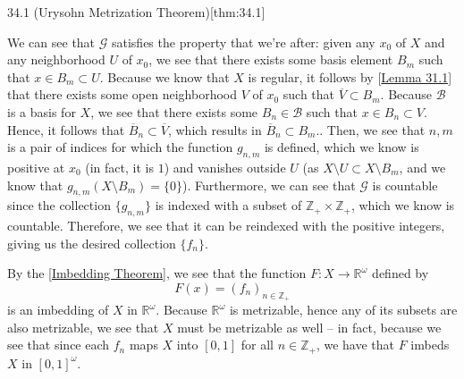 \begin{thmBox}{34.1 (Urysohn Metrization Theorem)}[thm:34.1]
\begin{proofBox}
        \baseSkip

        We can see that \( \mathcal{G} \) satisfies the property that we're after:
        given any \( x_{ 0 } \) of \( X \) and any neighborhood \( U \) of 
        \( x_{ 0 } \), we see that there exists some basis element \( B_{ m } \)
        such that \( x \in B_{ m } \subset U \).
        Because we know that \( X \) is regular, it follows by 
        [\hyperlink{lem:31.1}{Lemma 31.1}] that there exists some open neighborhood 
        \( V \) of \( x_{ 0 } \) such that \( \overline{ V } \subset B_{ m } \).
        Because \( \mathcal{B} \) is a basis for \( X \), we see that there exists 
        some \( B_{ n } \in \mathcal{B} \) such that \( x \in B_{ n } \subset V \).
        Hence, it follows that \( \overline{ B }_{ n } \subset \overline{ V } \),
        which results in \( \overline{ B }_{ n } \subset B_{ m } \)..
        Then, we see that \( n, m \) is a pair of indices for which the function
        \( g_{ n, m } \) is defined, which we know is positive at \( x_{ 0 } \)
        (in fact, it is \( 1 \)) and vanishes outside \( U \) (as 
        \( X \setminus U \subset X \setminus B_{ m } \), and we know that 
        \( g_{ n, m } ( X \setminus B_{ m } ) = \{ 0 \} \)).
        Furthermore, we can see that \( \mathcal{G} \) is countable since the 
        collection \( \{ g_{ n, m } \} \) is indexed with a subset of
        \( \mathbb{Z}_{ + } \times \mathbb{Z}_{ + } \), which we know is countable.
        Therefore, we see that it can be reindexed with the positive integers,
        giving us the desired collection \( \{ f_{ n } \} \).

        \baseSkip

        By the [\hyperlink{thm:34.2}{Imbedding Theorem}], we see that the function
        \( F: X \rightarrow \mathbb{R}^{ \omega } \) defined by 
        \begin{equation*}
            F ( x ) = ( f_{ n } )_{ n \in \mathbb{Z}_{ + } }
        \end{equation*}
        is an imbedding of \( X \) in \( \mathbb{R}^{ \omega } \).
        Because \( \mathbb{R}^{ \omega } \) is metrizable, hence any of its subsets
        are also metrizable,
        we see that \( X \) must be metrizable as well -- in fact, because we see that
        since each \( f_{ n } \) maps \( X \) into \( [ 0, 1 ] \) for all 
        \( n \in \mathbb{Z}_{ + } \), we have that \( F \) imbeds \( X \) in 
        \( [ 0, 1 ]^{ \omega } \).
    \end{proofBox}
\end{thmBox}

